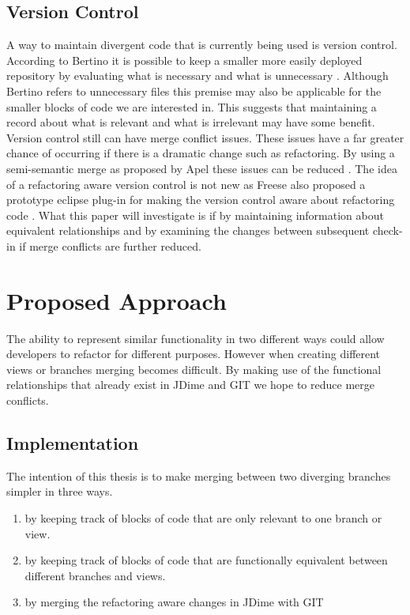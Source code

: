 \documentclass[12pt]{CRPITStyle}
\renewcommand{\cite}{\citep}
\begin{document}
\subsection{Version Control} 
A way to maintain divergent code that is currently being used is version control. According to Bertino it is possible to keep a smaller more easily deployed repository by evaluating what is necessary and what is unnecessary \cite{Bertino2012}. Although Bertino refers to unnecessary files this premise may also be applicable for the smaller blocks of code we are interested in. This suggests that maintaining a record about what is relevant and what is irrelevant may have some benefit. Version control still can have merge conflict issues. These issues have a far greater chance of occurring if there is a dramatic change such as refactoring. By using a semi-semantic merge as proposed by Apel these issues can be reduced \cite{Apel2011}. The idea of a refactoring aware version control is not new as Freese also proposed a prototype eclipse plug-in for making the version control aware about refactoring code \cite{Freese2006}. What this paper will investigate is if by maintaining information about equivalent relationships and by examining the changes between subsequent check-in if merge conflicts are further reduced. 
\section{Proposed Approach}
The ability to represent similar functionality in two different ways could allow developers to refactor for different purposes. However when creating different views or branches merging becomes difficult. By making use of the functional relationships that already exist in JDime and GIT we hope to reduce merge conflicts. 

\subsection{Implementation}

The intention of this thesis is to make merging between two diverging branches simpler in three ways. 

\begin{enumerate}

 \item by keeping track of blocks of code that are only relevant to one branch or view.
 \item by keeping track of blocks of code that are functionally equivalent between different branches and views.
 \item by merging the refactoring aware changes in JDime with GIT

\end{enumerate}
\end{document}
